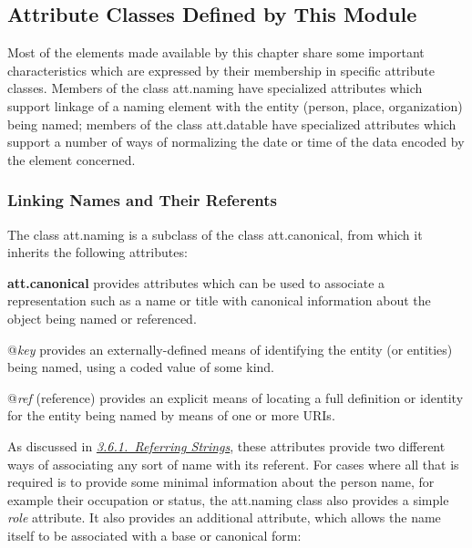 \subsection[{Attribute Classes Defined by This Module}]{Attribute Classes Defined by This Module}\label{NDATTS}\par
Most of the elements made available by this chapter share some important characteristics which are expressed by their membership in specific attribute classes. Members of the class \textsf{att.naming} have specialized attributes which support linkage of a naming element with the entity (person, place, organization) being named; members of the class \textsf{att.datable} have specialized attributes which support a number of ways of normalizing the date or time of the data encoded by the element concerned.
\subsubsection[{Linking Names and Their Referents}]{Linking Names and Their Referents}\label{NDATTSnr}\par
The class \textsf{att.naming} is a subclass of the class \textsf{att.canonical}, from which it inherits the following attributes: 
\begin{sansreflist}
  
\item [\textbf{att.canonical}] provides attributes which can be used to associate a representation such as a name or title with canonical information about the object being named or referenced.\hfil\\[-10pt]\begin{sansreflist}
    \item[@{\itshape key}]
  provides an externally-defined means of identifying the entity (or entities) being named, using a coded value of some kind.
    \item[@{\itshape ref}]
  (reference) provides an explicit means of locating a full definition or identity for the entity being named by means of one or more URIs.
\end{sansreflist}  
\end{sansreflist}
 As discussed in \textit{\hyperref[CONARS]{3.6.1.\ Referring Strings}}, these attributes provide two different ways of associating any sort of name with its referent. For cases where all that is required is to provide some minimal information about the person name, for example their occupation or status, the \textsf{att.naming} class also provides a simple {\itshape role} attribute. It also provides an additional attribute, which allows the name itself to be associated with a base or canonical form: 
